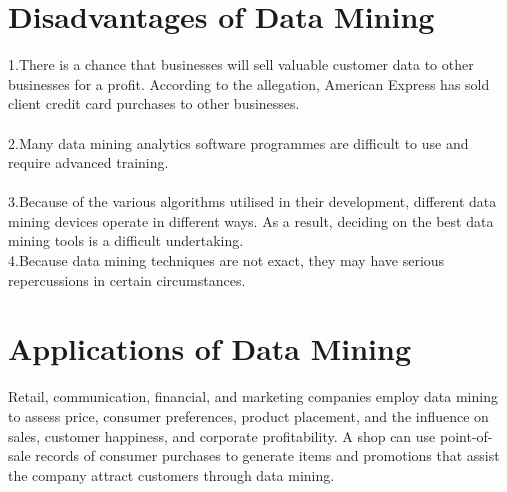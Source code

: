 \documentclass[12pt,letterpaper]{article}
\begin{document}
\section{Disadvantages of Data Mining}
1.There is a chance that businesses will sell valuable customer data to other businesses for a profit. According to the allegation, American Express has sold client credit card purchases to other businesses.\\
\\
2.Many data mining analytics software programmes are difficult to use and require advanced training.\\
\\
3.Because of the various algorithms utilised in their development, different data mining devices operate in different ways. As a result, deciding on the best data mining tools is a difficult undertaking.\\

4.Because data mining techniques are not exact, they may have serious repercussions in certain circumstances.
\section{Applications of Data Mining}
Retail, communication, financial, and marketing companies employ data mining to assess price, consumer preferences, product placement, and the influence on sales, customer happiness, and corporate profitability. A shop can use point-of-sale records of consumer purchases to generate items and promotions that assist the company attract customers through data mining.\\
\end{document}
